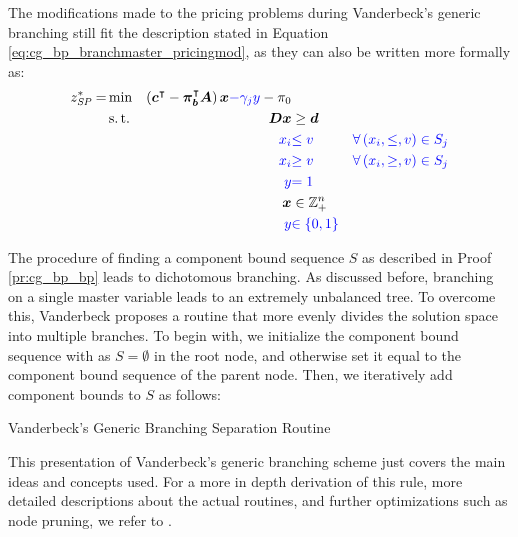 \begin{note}
The modifications made to the pricing problems during Vanderbeck's generic branching still fit the description stated in Equation \eqref{eq:cg_bp_branchmaster_pricingmod}, as they can also be written more formally as:
\begin{equation}
\begin{aligned}
z^*_\SP{} = &\min & \left( \vec{c}\transpose - \vec{\pi}_\vec{b}\transpose \mat{A} \right) \vec{x} {\color{blue} - \gamma_j y} - \pi_0 & \\
&\st & \mat{D} \vec{x} & \geq \vec{d} \\
&& {\color{blue} x_i} & {\color{blue} \leq v} & {\color{blue} \forall \left( x_i, \leq, v \right) \in S_j} \\
&& {\color{blue} x_i} & {\color{blue} \geq v} & {\color{blue} \forall \left( x_i, \geq, v \right) \in S_j} \\
&& {\color{blue} y} & {\color{blue} = 1} \\
&& \vec{x} & \in \mathbb{Z}_+^n \\
&& {\color{blue} y} & {\color{blue} \in \{0, 1\}}
\end{aligned}
\end{equation}
\end{note}

The procedure of finding a component bound sequence $S$ as described in Proof \ref{pr:cg_bp_bp} leads to dichotomous branching. As discussed before, branching on a single master variable leads to an extremely unbalanced tree. To overcome this, Vanderbeck proposes a routine that more evenly divides the solution space into multiple branches. To begin with, we initialize the component bound sequence with as $S = \emptyset$ in the root node, and otherwise set it equal to the component bound sequence of the parent node. Then, we iteratively add component bounds to $S$ as follows:
\begin{algorithm}
\caption{Vanderbeck's Generic Branching Separation Routine}
\end{algorithm}

This presentation of Vanderbeck's generic branching scheme just covers the main ideas and concepts used. For a more in depth derivation of this rule, more detailed descriptions about the actual routines, and further optimizations such as node pruning, we refer to \cite{vanderbeck1996exact, vanderbeck2010reformulation, vanderbeck2011branching, schmickerath2012experiments}.

